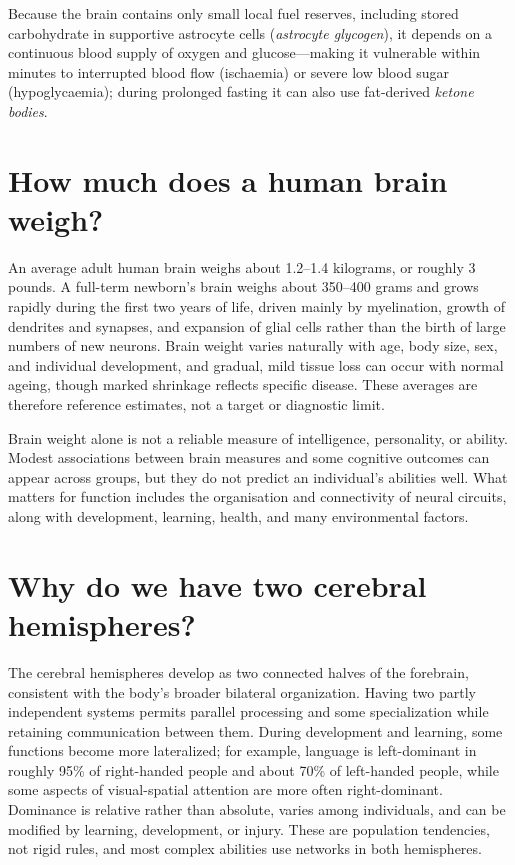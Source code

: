 \documentclass[11pt,oneside]{report}
\begin{document}
Because the brain contains only small local fuel reserves, including stored
carbohydrate in supportive astrocyte cells (\emph{astrocyte glycogen}), it
depends on a continuous blood supply of oxygen and glucose—making it vulnerable
within minutes to interrupted blood flow (ischaemia) or severe low blood sugar
(hypoglycaemia); during prolonged fasting it can also use fat-derived
\emph{ketone bodies}.

\section{How much does a human brain weigh?}

An average adult human brain weighs about 1.2--1.4 kilograms, or roughly
3 pounds. A full-term newborn's brain weighs about 350--400 grams and grows
rapidly during the first two years of life, driven mainly by myelination,
growth of dendrites and synapses, and expansion of glial cells rather than the
birth of large numbers of new neurons. Brain weight varies naturally with age,
body size, sex, and individual development, and gradual, mild tissue loss can
occur with normal ageing, though marked shrinkage reflects specific disease.
These averages are therefore reference estimates, not a target or diagnostic
limit.

Brain weight alone is not a reliable measure of intelligence, personality, or
ability. Modest associations between brain measures and some cognitive outcomes
can appear across groups, but they do not predict an individual's abilities
well. What matters for function includes the organisation and connectivity of
neural circuits, along with development, learning, health, and many environmental
factors.

\section{Why do we have two cerebral hemispheres?}

The cerebral hemispheres develop as two connected halves of the forebrain,
consistent with the body's broader bilateral organization. Having two partly
independent systems permits parallel processing and some specialization while
retaining communication between them. During development and learning, some
functions become more lateralized; for example, language is left-dominant in
roughly 95\% of right-handed people and about 70\% of left-handed people, while
some aspects of visual-spatial attention are more often right-dominant.
Dominance is relative rather than absolute, varies among
individuals, and can be modified by learning, development, or injury. These are
population tendencies, not rigid rules, and most complex abilities use networks
in both hemispheres.
\end{document}

